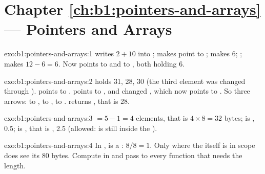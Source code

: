 \section*{Chapter \ref{ch:b1:pointers-and-arrays} --- Pointers and Arrays}

\begin{solution}{exo:b1:pointers-and-arrays:1}
 writes $2 + 10$ into ;  makes  point to ; 
makes  6; ;  makes  $12 - 6 = 6$. Now  points to  and
 to , both holding 6.
\end{solution}

\begin{solution}{exo:b1:pointers-and-arrays:2}
 holds 31, 28, 30 (the third element was changed through ).  points to
.  points to , and  changed , which now
points to . So three arrows:  to ,  to , 
to .  returns , that is 28.
\end{solution}

\begin{solution}{exo:b1:pointers-and-arrays:3}
 $= 5 - 1 = 4$ elements, that is $4 \times 8 = 32$ bytes;  is , 0.5;
 is , that is , 2.5 (allowed:  is still inside the ).
\end{solution}

\begin{solution}{exo:b1:pointers-and-arrays:4}
In ,  is a : $8 / 8 = 1$. Only where the  itself is in scope does 
see its 80 bytes. Compute  in  and pass  to every
function that needs the length.
\end{solution}

